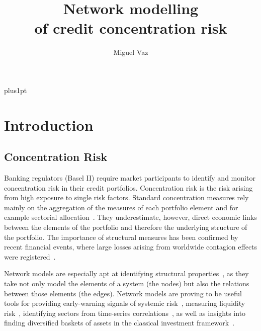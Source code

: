 \documentclass[12pt,beltcrest]{ociamthesis} %
\title{Network modelling \\[1ex]
of credit concentration risk}
\author{Miguel Vaz}        %
\begin{document}
\baselineskip=18pt plus1pt

\setcounter{secnumdepth}{3}
\setcounter{tocdepth}{3}


\maketitle                  %

\begin{romanpages}          %
\tableofcontents            %
\listoffigures              %
\end{romanpages}            %

\chapter{Introduction}
\section{Concentration Risk} %
\label{sec:concentration_risk}



Banking regulators (Basel II) require market participants to identify and monitor concentration risk in their credit portfolios. Concentration risk is the risk arising from high exposure to single risk factors. Standard concentration measures rely mainly on the aggregation of the measures of each portfolio element and for example sectorial allocation~\citep{lutkebohmert2008concentration}. They underestimate, however, direct economic links between the elements of the portfolio and therefore the underlying structure of the portfolio. The importance of structural measures has been confirmed by recent financial events, where large losses arising from worldwide contagion effects were registered~\citep{Kazi:2013vr}.
	
Network models are especially apt at identifying structural properties~\citep{newman2010networks}, as they take not only model the elements of a system (the nodes) but also the relations between those elements (the edges). Network models are proving to be useful tools for providing early-warning signals of systemic risk~\citep{Squartini:2013ev}, measuring liquidity risk~\citep{Karas:2012tp}, identifying sectors from time-series correlations~\citep{Onnela:2004vz,Fenn:2009uf,Fenn:2011kp}, as well as insights into finding diversified baskets of assets in the classical investment framework~\citep{Pozzi:2013ci}.
\end{document}
